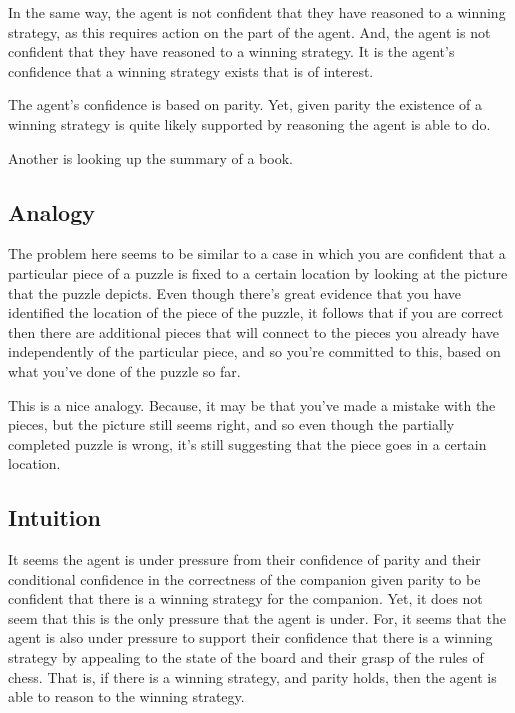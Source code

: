 \documentclass[10pt]{article}
\begin{document}
In the same way, the agent is not confident that they have reasoned to a winning strategy, as this requires action on the part of the agent.
And, the agent is not confident that they have reasoned to a winning strategy.
It is the agent's confidence that a winning strategy exists that is of interest.

The agent's confidence is based on parity.
Yet, given parity the existence of a winning strategy is quite likely supported by reasoning the agent is able to do.

\begin{note}
  Another is looking up the summary of a book.
\end{note}


\subsection{Analogy}
\label{sec:analogy}

The problem here seems to be similar to a case in which you are confident that a particular piece of a puzzle is fixed to a certain location by looking at the picture that the puzzle depicts.
Even though there's great evidence that you have identified the location of the piece of the puzzle, it follows that if you are correct then there are additional pieces that will connect to the pieces you already have independently of the particular piece, and so you're committed to this, based on what you've done of the puzzle so far.

This is a nice analogy.
Because, it may be that you've made a mistake with the pieces, but the picture still seems right, and so even though the partially completed puzzle is wrong, it's still suggesting that the piece goes in a certain location.



\newpage

\subsection{Intuition}
\label{sec:intuition}

It seems the agent is under pressure from their confidence of parity and their conditional confidence in the correctness of the companion given parity to be confident that there is a winning strategy for the companion.
Yet, it does not seem that this is the only pressure that the agent is under.
For, it seems that the agent is also under pressure to support their confidence that there is a winning strategy by appealing to the state of the board and their grasp of the rules of chess.
That is, if there is a winning strategy, and parity holds, then the agent is able to reason to the winning strategy.
\end{document}
